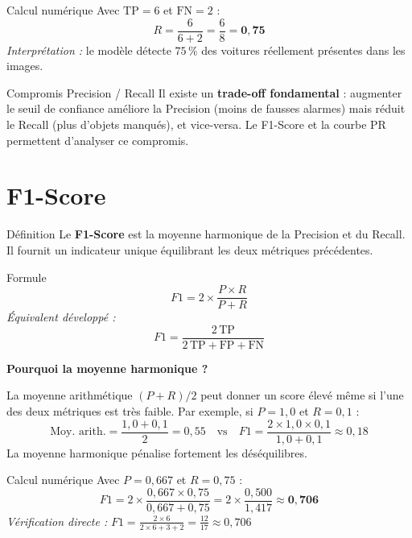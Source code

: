 \documentclass[12pt, a4paper]{report}
\newcommand{\tp}{\text{TP}}
\newcommand{\fp}{\text{FP}}
\newcommand{\fn}{\text{FN}}
\begin{document}
\begin{examplebox}{Calcul numérique}
  Avec $\tp=6$ et $\fn=2$ :
  \[
    R = \frac{6}{6 + 2} = \frac{6}{8} = \mathbf{0{,}75}
  \]
  \textit{Interprétation :} le modèle détecte $75\,\%$ des voitures réellement
  présentes dans les images.
\end{examplebox}

\begin{warningbox}{Compromis Precision / Recall}
  Il existe un \textbf{trade-off fondamental} : augmenter le seuil de confiance
  améliore la Precision (moins de fausses alarmes) mais réduit le Recall (plus
  d'objets manqués), et vice-versa. Le F1-Score et la courbe PR permettent
  d'analyser ce compromis.
\end{warningbox}

\section{F1-Score}

\begin{definitionbox}{Définition}
  Le \textbf{F1-Score} est la moyenne harmonique de la Precision et du Recall.
  Il fournit un indicateur unique équilibrant les deux métriques précédentes.
\end{definitionbox}

\begin{formulebox}{Formule}
  \[
    F1 = 2 \times \frac{P \times R}{P + R}
  \]
  \textit{Équivalent développé :}
  \[
    F1 = \frac{2\,\tp}{2\,\tp + \fp + \fn}
  \]
\end{formulebox}

\textbf{Pourquoi la moyenne harmonique ?}

La moyenne arithmétique $(P+R)/2$ peut donner un score élevé même si l'une des
deux métriques est très faible. Par exemple, si $P=1{,}0$ et $R=0{,}1$ :
\[
  \text{Moy. arith.} = \frac{1{,}0 + 0{,}1}{2} = 0{,}55 \quad \text{vs} \quad
  F1 = \frac{2 \times 1{,}0 \times 0{,}1}{1{,}0 + 0{,}1} \approx 0{,}18
\]
La moyenne harmonique pénalise fortement les déséquilibres.

\begin{examplebox}{Calcul numérique}
  Avec $P = 0{,}667$ et $R = 0{,}75$ :
  \[
    F1 = 2 \times \frac{0{,}667 \times 0{,}75}{0{,}667 + 0{,}75}
       = 2 \times \frac{0{,}500}{1{,}417} \approx \mathbf{0{,}706}
  \]
  \textit{Vérification directe :}
  $F1 = \frac{2 \times 6}{2 \times 6 + 3 + 2} = \frac{12}{17} \approx 0{,}706$ \checkmark
\end{examplebox}
\end{document}

